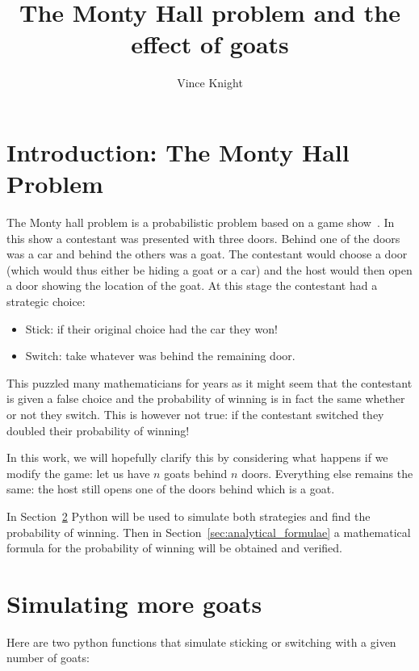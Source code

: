 \documentclass[a4paper]{article}
\title{The Monty Hall problem and the effect of goats}
\author{Vince Knight}
\date{}
\begin{document}
\maketitle

\section{Introduction: The Monty Hall Problem}

The Monty hall problem is a probabilistic problem based on a game
show~\cite{rosenhouse2009monty}. In this show a contestant was presented with
three doors. Behind one of the doors was a car and behind the others was a
goat. The contestant would choose a door (which would thus either be hiding a
goat or a car) and the host would then open a door showing the location of the
goat. At this stage the contestant had a strategic choice:

\begin{itemize}
    \item Stick: if their original choice had the car they won!
    \item Switch: take whatever was behind the remaining door.
\end{itemize}

This puzzled many mathematicians for years as it might seem that the contestant
is given a false choice and the probability of winning is in fact the same
whether or not they switch. This is however not true: if the contestant
switched they doubled their probability of winning!

In this work, we will hopefully clarify this by considering what happens if we
modify the game: let us have \(n\) goats behind \(n\) doors. Everything else
remains the same: the host still opens one of the doors behind which is a goat.

In Section~\ref{sec:simulation} Python will be used to simulate both strategies
and find the probability of winning. Then in
Section~\ref{sec:analytical_formulae} a mathematical formula for the probability
of winning will be obtained and verified.

\section{Simulating more goats}\label{sec:simulation}

Here are two python functions that simulate sticking or switching with a given
number of goats:
\end{document}
